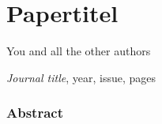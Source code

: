 \chapter{Papertitel}
\label{app:ammonium}
\newrefsection

You and all the other authors

\emph{Journal title}, year, issue, pages 

\subsection*{Abstract}
\lipsum[1]

%

\endrefsection

